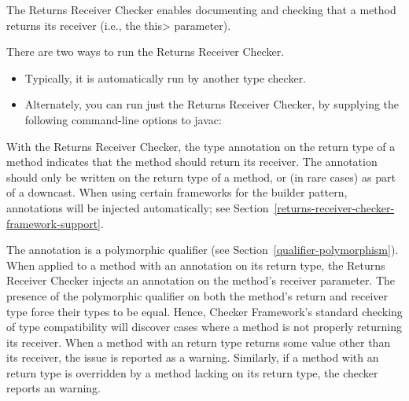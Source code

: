 \htmlhr
{}

The Returns Receiver Checker enables documenting and checking that a method
returns its receiver (i.e., the \<this> parameter).

There are two ways to run the Returns Receiver Checker.
\begin{itemize}
\item
Typically, it is automatically run by another type checker.
\item
Alternately, you can run just the Returns Receiver Checker, by
supplying the following command-line options to javac:
\end{itemize}



With the Returns Receiver Checker, the type annotation
 on the return type of a method
indicates that the method should return its receiver.  The
 annotation should only be written
on the return type of a method, or (in rare cases) as part of a downcast.  When
using certain frameworks for the builder pattern,
 annotations will be injected
automatically; see Section~\ref{returns-receiver-checker-framework-support}.



The  annotation is a polymorphic
qualifier (see Section~\ref{qualifier-polymorphism}).  When applied to a method
with an  annotation on its return
type, the Returns Receiver Checker injects an
 annotation on the method's receiver
parameter.  The presence of the polymorphic
 qualifier on both the method's
return and receiver type force their types to be equal.  Hence, Checker
Framework's standard checking of type compatibility will discover cases where a
method is not properly returning its receiver.  When a method with an
 return type returns some value
other than its receiver, the issue is reported as a
 warning.  Similarly, if a method with an
 return type is overridden by a
method lacking  on its return type,
the checker reports an  warning.

